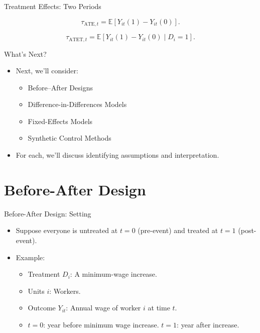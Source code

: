 \documentclass[11pt,aspectratio=169]{beamer}
\newcommand{\E}{\mathbb{E}}
\begin{document}
\begin{frame}{Treatment Effects: Two Periods}
\begin{definitionbox}
\[\tau_{\text{ATE},t}=\E[Y_{it}(1)-Y_{it}(0)].\]
\end{definitionbox}
\begin{definitionbox}
\[\tau_{\text{ATET},t}=\E[Y_{it}(1)-Y_{it}(0)\mid D_i=1].\]
\end{definitionbox}
\end{frame}

\begin{frame}{What's Next?}
\begin{itemize}
  \item Next, we'll consider:
  \begin{itemize}
    \item Before--After Designs
    \item Difference-in-Differences Models
    \item Fixed-Effects Models
    \item Synthetic Control Methods
  \end{itemize}
  \item For each, we'll discuss identifying assumptions and interpretation.
\end{itemize}
\end{frame}


\section{Before-After Design}

\begin{frame}{Before-After Design: Setting}
\begin{itemize}
  \item Suppose everyone is untreated at $t=0$ (pre-event) and treated at $t=1$ (post-event).
  \item Example:
  \begin{itemize}
    \item Treatment $D_i$: A minimum-wage increase.
    \item Units $i$: Workers.
    \item Outcome $Y_{it}$: Annual wage of worker $i$ at time $t$.
    \item $t=0$: year before minimum wage increase. $t=1$: year after increase.
  \end{itemize}
\end{itemize}
\end{frame}
\end{document}
